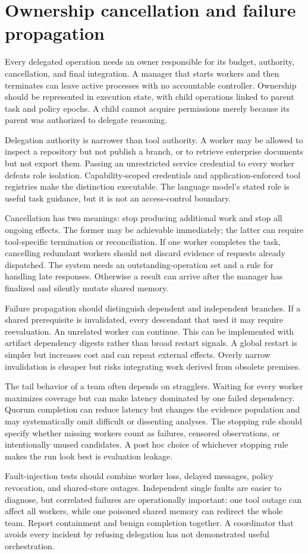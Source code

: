 \section{Ownership cancellation and failure propagation}\label{sec:C21:ownership}
Every delegated operation needs an owner responsible for its budget, authority, cancellation, and final integration. A manager that starts workers and then terminates can leave active processes with no accountable controller. Ownership should be represented in execution state, with child operations linked to parent task and policy epochs. A child cannot acquire permissions merely because its parent was authorized to delegate reasoning.

Delegation authority is narrower than tool authority. A worker may be allowed to inspect a repository but not publish a branch, or to retrieve enterprise documents but not export them. Passing an unrestricted service credential to every worker defeats role isolation. Capability-scoped credentials and application-enforced tool registries make the distinction executable. The language model's stated role is useful task guidance, but it is not an access-control boundary.

Cancellation has two meanings: stop producing additional work and stop all ongoing effects. The former may be achievable immediately; the latter can require tool-specific termination or reconciliation. If one worker completes the task, cancelling redundant workers should not discard evidence of requests already dispatched. The system needs an outstanding-operation set and a rule for handling late responses. Otherwise a result can arrive after the manager has finalized and silently mutate shared memory.

Failure propagation should distinguish dependent and independent branches. If a shared prerequisite is invalidated, every descendant that used it may require reevaluation. An unrelated worker can continue. This can be implemented with artifact dependency digests rather than broad restart signals. A global restart is simpler but increases cost and can repeat external effects. Overly narrow invalidation is cheaper but risks integrating work derived from obsolete premises.

The tail behavior of a team often depends on stragglers. Waiting for every worker maximizes coverage but can make latency dominated by one failed dependency. Quorum completion can reduce latency but changes the evidence population and may systematically omit difficult or dissenting analyses. The stopping rule should specify whether missing workers count as failures, censored observations, or intentionally unused candidates. A post hoc choice of whichever stopping rule makes the run look best is evaluation leakage.

Fault-injection tests should combine worker loss, delayed messages, policy revocation, and shared-store outages. Independent single faults are easier to diagnose, but correlated failures are operationally important: one tool outage can affect all workers, while one poisoned shared memory can redirect the whole team. Report containment and benign completion together. A coordinator that avoids every incident by refusing delegation has not demonstrated useful orchestration.

